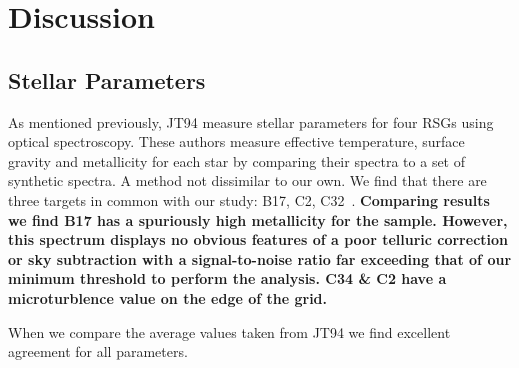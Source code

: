\documentclass[useAMS,usenatbib]{mn2e}
\begin{document}
\section{Discussion} %
\label{sec:discussion}


\subsection{Stellar Parameters} %
\label{sub:stellar_parameters_disc}
As mentioned previously, JT94 measure stellar parameters for four RSGs using optical spectroscopy.
These authors measure effective temperature, surface gravity and metallicity for each star by comparing their spectra to a set of synthetic spectra.
A method not dissimilar to our own.
We find that there are three targets in common with our study: B17, C2, C32~\citep[using the][nomenclature]{1974A&AS...15..261R}.
\textbf{Comparing results we find B17 has a spuriously high metallicity for the sample.
However, this spectrum displays no obvious features of a poor telluric correction or sky subtraction with a signal-to-noise ratio far exceeding that of our minimum threshold to perform the analysis.
C34 \& C2 have a microturblence value on the edge of the grid.}


When we compare the average values taken from JT94 we find excellent agreement for all parameters.

\end{document}
